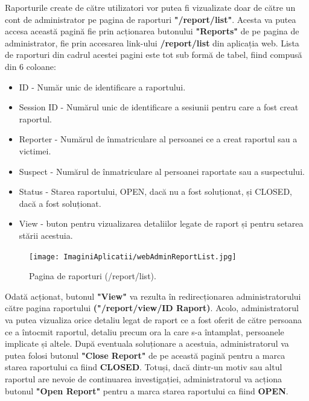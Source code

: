 \documentclass[12pt]{article}
\begin{document}
Raporturile create de c\u{a}tre utilizatori vor putea fi vizualizate doar de c\u{a}tre un cont de administrator pe pagina de raporturi \textbf{"/report/list"}. Acesta va putea accesa aceast\u{a} pagin\u{a} fie prin acționarea butonului \textbf{"Reports"} de pe pagina de administrator, fie prin accesarea link-ului \textbf{/report/list} din aplicația web. Lista de raporturi din cadrul acestei pagini este tot sub form\u{a} de tabel, fiind compus\u{a} din 6 coloane:

\begin{itemize}
    \item ID - Num\u{a}r unic de identificare a raportului.
    \item Session ID - Num\u{a}rul unic de identificare a sesiunii pentru care a fost creat raportul.
    \item Reporter - Num\u{a}rul de \^{i}nmatriculare al persoanei ce a creat raportul sau a victimei.
    \item Suspect - Num\u{a}rul de \^{i}nmatriculare al persoanei raportate sau a suspectului.
    \item Status - Starea raportului, OPEN, dac\u{a} nu a fost soluționat, și CLOSED, dac\u{a} a fost soluționat.
    \item View - buton pentru vizualizarea detaliilor legate de raport și pentru setarea st\u{a}rii acestuia.
\end{itemize}

\begin{figure}[H]
  \centering
  \texttt{[image: ImaginiAplicatii/webAdminReportList.jpg]}
  \caption{Pagina de raporturi (/report/list).}
  \label{fig:aplicatie_admin_report}
\end{figure}

Odat\u{a} acționat, butonul \textbf{"View"} va rezulta \^{i}n redirecționarea administratorului c\u{a}tre pagina raportului \textbf{("/report/view/{ID Raport})}. Acolo, administratorul va putea vizualiza orice detaliu legat de raport ce a fost oferit de c\u{a}tre persoana ce a \^{i}ntocmit raportul, detaliu precum ora la care s-a \^{i}ntamplat, persoanele implicate și altele. Dup\u{a} eventuala soluționare a acestuia, administratorul va putea folosi butonul \textbf{"Close Report"} de pe aceast\u{a} pagin\u{a} pentru a marca starea raportului ca fiind \textbf{CLOSED}. Totuși, dac\u{a} dintr-un motiv sau altul raportul are nevoie de continuarea investigației, administratorul va acționa butonul \textbf{"Open Report"} pentru a marca starea raportului ca fiind \textbf{OPEN}.
\end{document}
